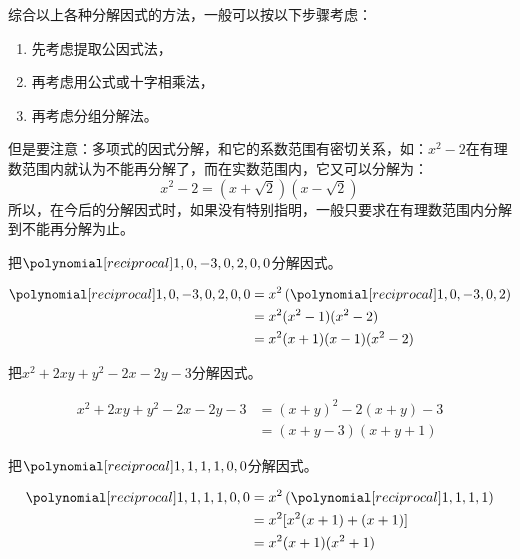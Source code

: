 综合以上各种分解因式的方法，一般可以按以下步骤考虑：
\begin{enumerate}
    \item 先考虑提取公因式法，
    \item 再考虑用公式或十字相乘法，
    \item 再考虑分组分解法。
\end{enumerate}

但是要注意：多项式的因式分解，和它的系数范围有密切关系，如：$x^2-2$在有理数范围内就认为不能再分解了，而在实数范围内，它又可以分解为：
\[x^2-2=(x+\sqrt{2})(x-\sqrt{2})\]
所以，在今后的分解因式时，如果没有特别指明，一般只要求在有理数范围内分解到不能再分解为止。

\begin{example}
    把$\poly{1,0,-3,0,2,0,0}$分解因式。
\end{example}

\begin{solution}
 \[\begin{split}
    \poly{1,0,-3,0,2,0,0}&=x^2\left(\poly{1,0,-3,0,2}\right)\\
    &=x^2(x^2-1)(x^2-2)\\
    &=x^2(x+1)(x-1)(x^2-2)    
 \end{split}\]   
\end{solution}


\begin{example}
    把$x^2+2xy+y^2-2x-2y-3$分解因式。
\end{example}

\begin{solution}
    \[\begin{split}
        x^2+2xy+y^2-2x-2y-3&=(x+y)^2 -2(x+y)-3\\
        &=(x+y-3)(x+y+1)    
    \end{split}\]
\end{solution}

\begin{example}
    把$\poly{1,1,1,1,0,0}$分解因式。 
\end{example}

\begin{solution}
    \[\begin{split}
        \poly{1,1,1,1,0,0}&=x^2\left(\poly{1,1,1,1}\right)\\
        &=x^2[x^2(x+1)+(x+1)]\\
        &=x^2(x+1)(x^2+1)       
    \end{split}\]
\end{solution}


